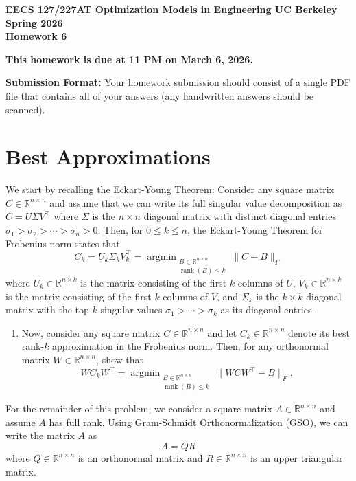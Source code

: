 \documentclass[10pt]{article}
\theoremstyle{definition}
\theoremstyle{plain}
\newcommand{\RR}{\mathbb{R}}
\DeclareMathOperator{\rank}{rank}
\DeclareMathOperator*{\argmin}{argmin}
\begin{document}
\begin{center}
    {\large\bfseries EECS 127/227AT \quad Optimization Models in Engineering \quad UC Berkeley \quad Spring 2026}\\[1ex]
    {\LARGE\bfseries Homework 6}
\end{center}

\medskip

\textbf{This homework is due at 11 PM on March 6, 2026.}

\textbf{Submission Format:} Your homework submission should consist of a single PDF file that contains all of your answers (any handwritten answers should be scanned).

\section{Best Approximations}

We start by recalling the Eckart-Young Theorem: Consider any square matrix $C \in \RR^{n \times n}$ and assume that we can write its full singular value decomposition as $C = U\Sigma V^\top$ where $\Sigma$ is the $n \times n$ diagonal matrix with distinct diagonal entries $\sigma_1 > \sigma_2 > \cdots > \sigma_n > 0$. Then, for $0 \le k \le n$, the Eckart-Young Theorem for Frobenius norm states that
\[
    C_k = U_k \Sigma_k V_k^\top = \argmin_{\substack{B \in \RR^{n \times n} \\ \rank(B) \le k}} \|C - B\|_F
\]
where $U_k \in \RR^{n \times k}$ is the matrix consisting of the first $k$ columns of $U$, $V_k \in \RR^{n \times k}$ is the matrix consisting of the first $k$ columns of $V$, and $\Sigma_k$ is the $k \times k$ diagonal matrix with the top-$k$ singular values $\sigma_1 > \cdots > \sigma_k$ as its diagonal entries.

\begin{enumerate}[label=(\alph*)]
    \item Now, consider any square matrix $C \in \RR^{n \times n}$ and let $C_k \in \RR^{n \times n}$ denote its best rank-$k$ approximation in the Frobenius norm. Then, for any orthonormal matrix $W \in \RR^{n \times n}$, show that
    \[
        W C_k W^\top = \argmin_{\substack{B \in \RR^{n \times n} \\ \rank(B) \le k}} \|WCW^\top - B\|_F.
    \]
\end{enumerate}

For the remainder of this problem, we consider a square matrix $A \in \RR^{n \times n}$ and assume $A$ has full rank. Using Gram-Schmidt Orthonormalization (GSO), we can write the matrix $A$ as
\begin{equation}
    A = QR
\end{equation}
where $Q \in \RR^{n \times n}$ is an orthonormal matrix and $R \in \RR^{n \times n}$ is an upper triangular matrix.
\end{document}
